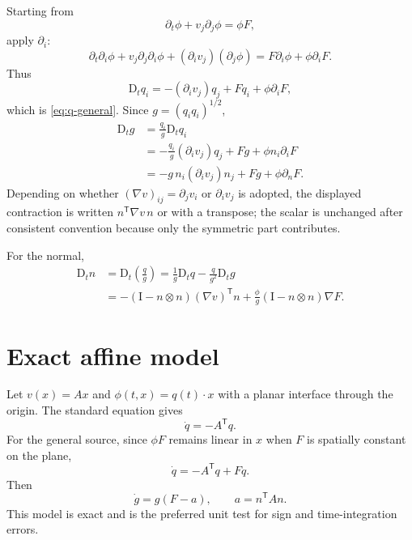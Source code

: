 \documentclass[11pt,a4paper]{article}
\theoremstyle{definition}
\theoremstyle{remark}
\newcommand{\Id}{\mathrm{I}}
\newcommand{\material}{\mathrm{D}_t}
\begin{document}
Starting from
\begin{equation}
  \partial_t\phi+v_j\partial_j\phi=\phi F,
\end{equation}
apply $\partial_i$:
\begin{equation}
  \partial_t\partial_i\phi
  +v_j\partial_j\partial_i\phi
  +(\partial_i v_j)(\partial_j\phi)
  =F\partial_i\phi+\phi\partial_iF.
\end{equation}
Thus
\begin{equation}
  \material q_i=-(\partial_i v_j)q_j+Fq_i+\phi\partial_iF,
\end{equation}
which is \eqref{eq:q-general}. Since $g=(q_iq_i)^{1/2}$,
\begin{align}
  \material g
  &=\frac{q_i}{g}\material q_i\\
  &=-\frac{q_i}{g}(\partial_i v_j)q_j+Fg+\phi n_i\partial_iF\\
  &=-g\,n_i(\partial_i v_j)n_j+Fg+\phi\partial_nF.
\end{align}
Depending on whether $(\nabla v)_{ij}=\partial_jv_i$ or $\partial_iv_j$ is adopted, the displayed contraction is written $n^{\mathsf T}\nabla v\,n$ or with a transpose; the scalar is unchanged after consistent convention because only the symmetric part contributes.

For the normal,
\begin{align}
  \material n
  &=\material\left(\frac qg\right)
  =\frac1g\material q-\frac q{g^2}\material g\\
  &=-\left(\Id-n\otimes n\right)(\nabla v)^{\mathsf T}n
    +\frac\phi g\left(\Id-n\otimes n\right)\nabla F.
\end{align}

\section{Exact affine model}

Let $v(x)=Ax$ and $\phi(t,x)=q(t)\cdot x$ with a planar interface through the origin. The standard equation gives
\begin{equation}
  \dot q=-A^{\mathsf T}q.
\end{equation}
For the general source, since $\phi F$ remains linear in $x$ when $F$ is spatially constant on the plane,
\begin{equation}
  \dot q=-A^{\mathsf T}q+Fq.
\end{equation}
Then
\begin{equation}
  \dot g=g(F-a),
  \qquad a=n^{\mathsf T}An.
\end{equation}
This model is exact and is the preferred unit test for sign and time-integration errors.
\end{document}
